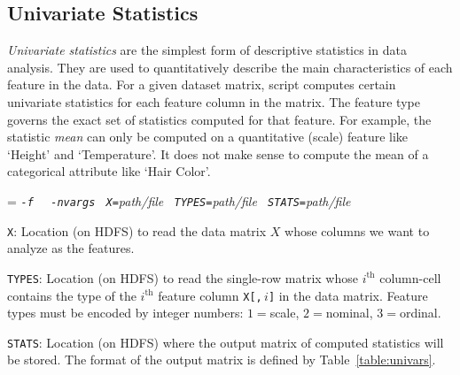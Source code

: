 \subsection{Univariate Statistics}

\smallskip

\emph{Univariate statistics} are the simplest form of descriptive statistics in data
analysis.  They are used to quantitatively describe the main characteristics of each
feature in the data.  For a given dataset matrix, script \UnivarScriptName{} computes
certain univariate statistics for each feature column in the
matrix.  The feature type governs the exact set of statistics computed for that feature.
For example, the statistic \emph{mean} can only be computed on a quantitative (scale)
feature like `Height' and `Temperature'.  It does not make sense to compute the mean
of a categorical attribute like `Hair Color'.


\smallskip
{}
\smallskip

{\hangindent=\parindent\noindent\it%
{\tt{}-f } \UnivarScriptName{}
{\tt{} -nvargs}
{\tt{} X=}path/file
{\tt{} TYPES=}path/file
{\tt{} STATS=}path/file

}


\medskip
\pagebreak[2]
\begin{Description}
\item[{\tt X}:]
Location (on HDFS) to read the data matrix $X$ whose columns we want to
analyze as the features.
\item[{\tt TYPES}:] %
Location (on HDFS) to read the single-row matrix whose $i^{\textrm{th}}$
column-cell contains the type of the $i^{\textrm{th}}$ feature column
\texttt{X[,$\,i$]} in the data matrix.  Feature types must be encoded by
integer numbers: $1 = {}$scale, $2 = {}$nominal, $3 = {}$ordinal.
\item[{\tt STATS}:]
Location (on HDFS) where the output matrix of computed statistics
will be stored.  The format of the output matrix is defined by
Table~\ref{table:univars}.
\end{Description}

